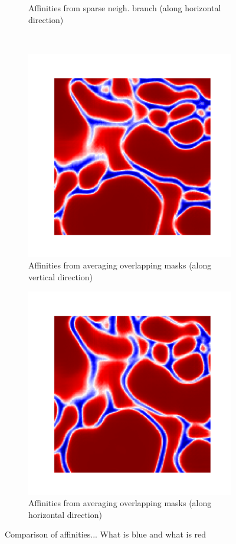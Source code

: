 \begin{figure}[t]
\begin{subfigure}[t]{0.47\textwidth}
\caption{\centering Affinities from sparse neigh. branch (along horizontal direction)}
\end{subfigure}\vspace{2em}\\
\begin{subfigure}[t]{0.47\linewidth}
\centering
\includegraphics[width=0.75\linewidth,trim=1.50in 1.4in 1.4in 1.50in,clip]{./figs/affs_compare/affs3.pdf} %
\caption{\centering Affinities from averaging overlapping masks (along vertical direction)}
\end{subfigure}\hfill
\begin{subfigure}[t]{0.47\textwidth}
\centering
\includegraphics[width=0.75\linewidth,trim=1.50in 1.4in 1.4in 1.50in,clip]{./figs/affs_compare/affs4.pdf} %
\caption{\centering Affinities from averaging overlapping masks (along horizontal direction)}
\end{subfigure}
\caption{Comparison of affinities... What is blue and what is red}\label{fig:affs_comparison}
\end{figure}


